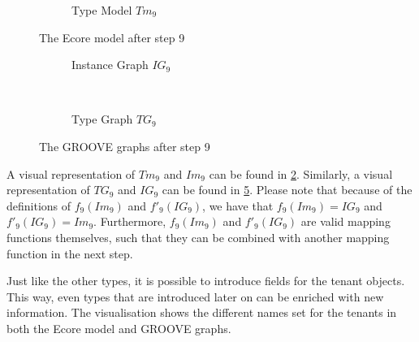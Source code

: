 \begin{figure}[p]
\begin{subfigure}{0.98\textwidth}
        \caption{Type Model $Tm_9$}
        \label{fig:application:building_the_model:tenant_names:ecore:type_model}
    \end{subfigure}
    \caption{The Ecore model after step 9}
    \label{fig:application:building_the_model:tenant_names:ecore}
\end{figure}

\begin{figure}[p]
    \centering
    \begin{subfigure}{0.98\textwidth}
        \centering
        
        \caption{Instance Graph $IG_9$}
        \label{fig:application:building_the_model:tenant_names:groove:instance_graph}
    \end{subfigure}
    \\
    \begin{subfigure}{0.98\textwidth}
        \centering
        
        \caption{Type Graph $TG_9$}
        \label{fig:application:building_the_model:tenant_names:groove:type_graph}
    \end{subfigure}
    \caption{The GROOVE graphs after step 9}
    \label{fig:application:building_the_model:tenant_names:groove}
\end{figure}

A visual representation of $Tm_9$ and $Im_9$ can be found in \cref{fig:application:building_the_model:tenant_names:ecore}. Similarly, a visual representation of $TG_9$ and $IG_9$ can be found in \cref{fig:application:building_the_model:tenant_names:groove}. Please note that because of the definitions of $f_9(Im_9)$ and $f'_9(IG_9)$, we have that $f_9(Im_9) = IG_9$ and $f'_9(IG_9) = Im_9$. Furthermore, $f_9(Im_9)$ and $f'_9(IG_9)$ are valid mapping functions themselves, such that they can be combined with another mapping function in the next step.

Just like the other types, it is possible to introduce fields for the tenant objects. This way, even types that are introduced later on can be enriched with new information. The visualisation shows the different names set for the tenants in both the Ecore model and GROOVE graphs.

\afterpage{\FloatBarrier}